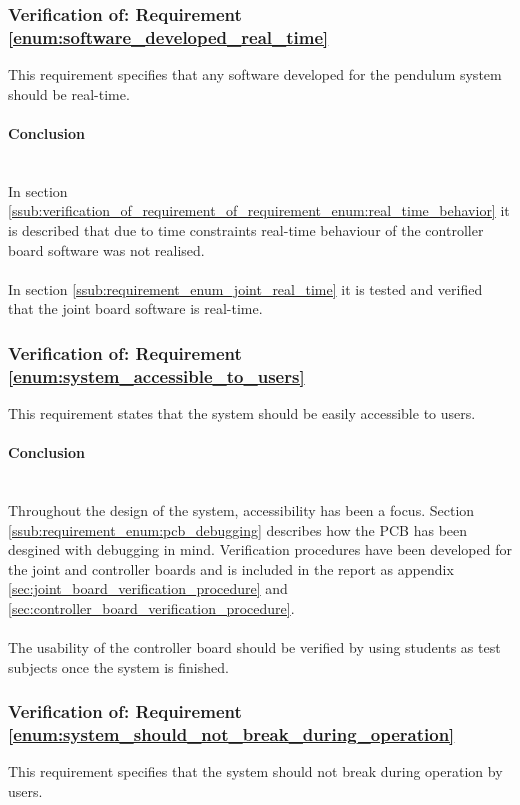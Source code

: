 \subsubsection{Verification of: Requirement \ref{enum:software_developed_real_time}} %
\label{sub:verification_of_requirement_enum:software_developed_real_time}
This requirement specifies that any software developed for the pendulum system should be real-time.

\paragraph{Conclusion}~\\
In section \ref{ssub:verification_of_requirement_of_requirement_enum:real_time_behavior} it is described that due to time constraints real-time behaviour of the controller board software was not realised.
\\~\\
In section \ref{ssub:requirement_enum_joint_real_time} it is tested and verified that the joint board software is real-time.


\subsubsection{Verification of: Requirement \ref{enum:system_accessible_to_users}} %
\label{sub:verification_of_requirement_enum:system_accessible_to_users}
This requirement states that the system should be easily accessible to users.

\paragraph{Conclusion}~\\
Throughout the design of the system, accessibility has been a focus.
Section \ref{ssub:requirement_enum:pcb_debugging} describes how the PCB has been desgined with debugging in mind.
Verification procedures have been developed for the joint and controller boards and is included in the report as appendix \ref{sec:joint_board_verification_procedure} and \ref{sec:controller_board_verification_procedure}.
\\~\\
The usability of the controller board should be verified by using students as test subjects once the system is finished. 

\subsubsection{Verification of: Requirement \ref{enum:system_should_not_break_during_operation}} %
\label{sub:verification_of_requirement_enum:system_should_not_break_during_operation}
This requirement specifies that the system should not break during operation by users.

